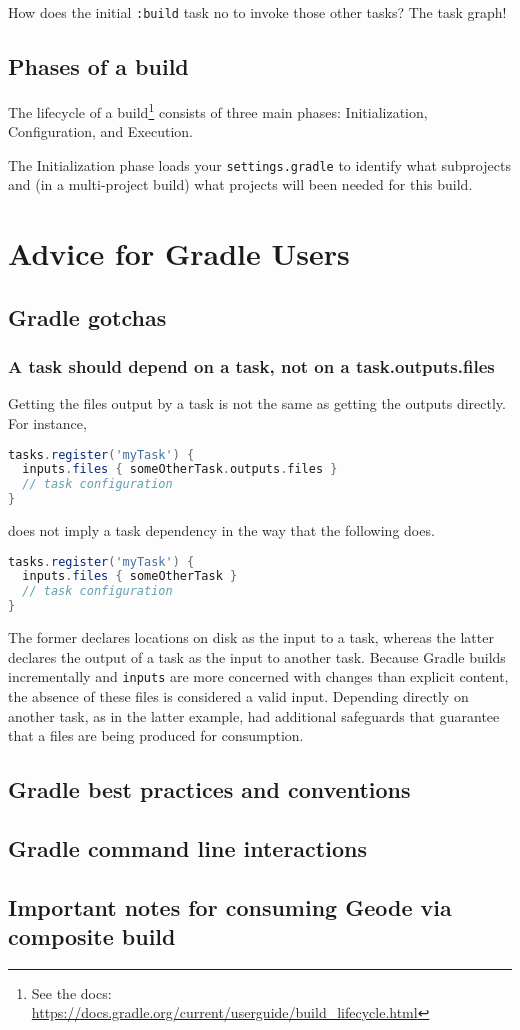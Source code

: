 \documentclass[]{article}
\theoremstyle{definition}
\begin{document}
How does the initial \texttt{:build} task no to invoke those other tasks?
The task graph!

\subsection{Phases of a build}
The lifecycle of a build\footnote{See the docs: \url{https://docs.gradle.org/current/userguide/build_lifecycle.html}} consists of three main phases: Initialization, Configuration, and Execution.

The Initialization phase loads your \texttt{settings.gradle} to identify what subprojects and (in a multi-project build) what projects will been needed for this build.



\section{Advice for Gradle Users}

\subsection{Gradle gotchas}

\subsubsection{A task should depend on a task, not on a task.outputs.files}
Getting the files output by a task is not the same as getting the outputs directly.  For instance,
\begin{lstlisting}[language=Groovy]
tasks.register('myTask') {
  inputs.files { someOtherTask.outputs.files }
  // task configuration
}
\end{lstlisting}

does not imply a task dependency in the way that the following does.
\begin{lstlisting}[language=Groovy]
tasks.register('myTask') {
  inputs.files { someOtherTask }
  // task configuration
}
\end{lstlisting}

The former declares locations on disk as the input to a task, whereas the latter declares the output of a task as the input to another task.
Because Gradle builds incrementally and \texttt{inputs} are more concerned with changes than explicit content, the absence of these files is considered a valid input.
Depending directly on another task, as in the latter example, had additional safeguards that guarantee that a files are being produced for consumption.

\subsection{Gradle best practices and conventions}

\subsection{Gradle command line interactions}

\subsection{Important notes for consuming Geode via composite build}
\end{document}
